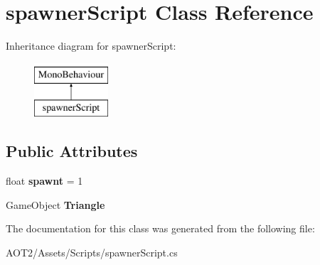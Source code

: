 \hypertarget{classspawner_script}{}\section{spawner\+Script Class Reference}
\label{classspawner_script}
Inheritance diagram for spawner\+Script\+:\begin{figure}[H]
\begin{center}
\leavevmode
\includegraphics[height=2.000000cm]{classspawner_script}
\end{center}
\end{figure}
\subsection*{Public Attributes}
\begin{DoxyCompactItemize}
\item 
\hypertarget{classspawner_script_a93800079e4f6fcd8728db3d0735aba79}{}float {\bfseries spawnt} = 1\label{classspawner_script_a93800079e4f6fcd8728db3d0735aba79}

\item 
\hypertarget{classspawner_script_ad99dc33b3262b1bb666846d952e5e0f4}{}Game\+Object {\bfseries Triangle}\label{classspawner_script_ad99dc33b3262b1bb666846d952e5e0f4}

\end{DoxyCompactItemize}


The documentation for this class was generated from the following file\+:\begin{DoxyCompactItemize}
\item 
A\+O\+T2/\+Assets/\+Scripts/spawner\+Script.\+cs\end{DoxyCompactItemize}
